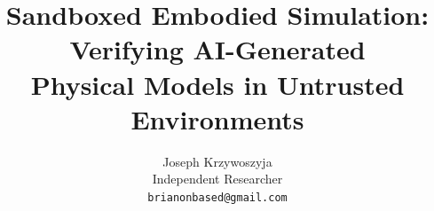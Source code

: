 \documentclass[letterpaper,twocolumn,10pt]{article}
\begin{document}
\sloppy

\title{\Large \bf Sandboxed Embodied Simulation: Verifying AI-Generated\\Physical Models in Untrusted Environments}

\author{
{\rm Joseph Krzywoszyja}\\
Independent Researcher\\
\texttt{brianonbased@gmail.com}
}

\maketitle

\end{document}
